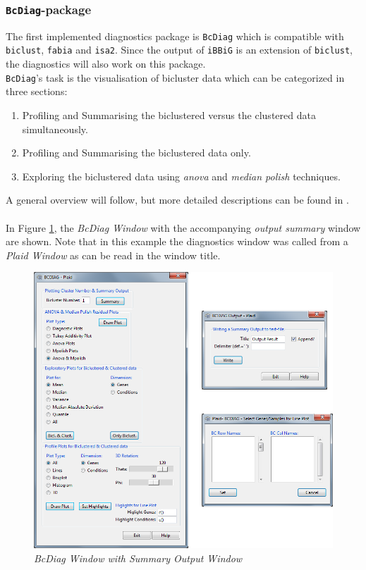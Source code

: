 \documentclass[a4paper]{article}\usepackage[]{graphicx}\usepackage[]{color}
\begin{document}
\subsubsection{\texttt{BcDiag}-package}
The first implemented diagnostics package is \verb|BcDiag| which is compatible
with \verb|biclust|, \verb|fabia| and \verb|isa2|. Since the output of \verb|iBBiG|
is an extension of \verb|biclust|, the diagnostics will also work on this
package.\\
\verb|BcDiag|'s task is the visualisation of bicluster data which can be
categorized in three sections:
\begin{enumerate}
  \item Profiling and Summarising the biclustered versus the clustered data
  simultaneously.
  \item Profiling and Summarising the biclustered data only.
  \item Exploring the biclustered data using {\it anova} and {\it median polish}
  techniques.
\end{enumerate}
\noindent A general overview will follow, but more detailed descriptions can be
found in \citet{Aregay2014}.
\\ \\
\noindent In Figure \ref{bcdiag_summary}, the {\it BcDiag Window}
with the accompanying {\it output summary} window are shown. Note that in this example the diagnostics
window was called from a {\it Plaid Window} as can be read in the window title.
\begin{figure}[H]
\centering
\includegraphics[scale=0.5]{figures/bcdiag_summary.png}
\caption{{\it BcDiag Window with Summary Output Window}\label{bcdiag_summary}}
\end{figure}
\end{document}
